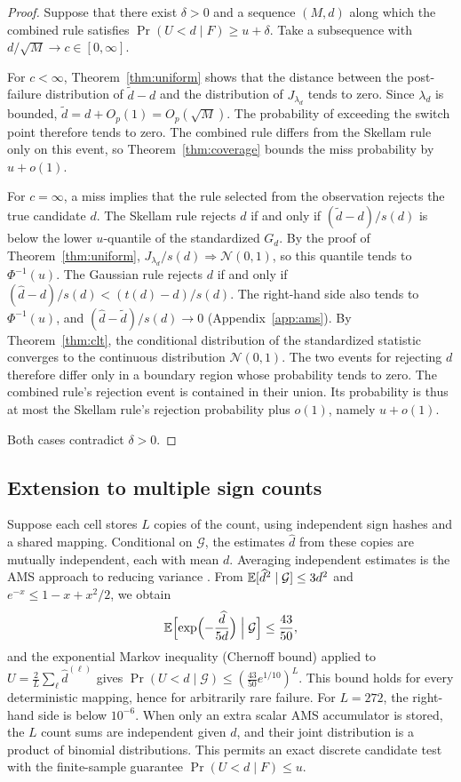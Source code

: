 \begin{proof}
Suppose that there exist $\delta>0$ and a sequence $(M,d)$ along which the combined rule satisfies $\Pr(U<d\mid F)\ge u+\delta$. Take a subsequence with $d/\sqrt M\to c\in[0,\infty]$.

For $c<\infty$, Theorem~\ref{thm:uniform} shows that the distance between the post-failure distribution of $\widetilde d-d$ and the distribution of $J_{\lambda_d}$ tends to zero. Since $\lambda_d$ is bounded, $\widetilde d=d+O_p(1)=O_p(\sqrt M)$. The probability of exceeding the switch point therefore tends to zero. The combined rule differs from the Skellam rule only on this event, so Theorem~\ref{thm:coverage} bounds the miss probability by $u+o(1)$.

For $c=\infty$, a miss implies that the rule selected from the observation rejects the true candidate $d$. The Skellam rule rejects $d$ if and only if $(\widetilde d-d)/s(d)$ is below the lower $u$-quantile of the standardized $G_d$. By the proof of Theorem~\ref{thm:uniform}, $J_{\lambda_d}/s(d)\Rightarrow\mathcal N(0,1)$, so this quantile tends to $\Phi^{-1}(u)$. The Gaussian rule rejects $d$ if and only if $(\widehat d-d)/s(d)<(t(d)-d)/s(d)$. The right-hand side also tends to $\Phi^{-1}(u)$, and $(\widehat d-\widetilde d)/s(d)\to0$ (Appendix~\ref{app:ams}). By Theorem~\ref{thm:clt}, the conditional distribution of the standardized statistic converges to the continuous distribution $\mathcal N(0,1)$. The two events for rejecting $d$ therefore differ only in a boundary region whose probability tends to zero. The combined rule's rejection event is contained in their union. Its probability is thus at most the Skellam rule's rejection probability plus $o(1)$, namely $u+o(1)$.

Both cases contradict $\delta>0$.
\end{proof}

\subsection{Extension to multiple sign counts}\label{app:multi}
Suppose each cell stores $L$ copies of the count, using independent sign hashes and a shared mapping. Conditional on $\mathcal G$, the estimates $\widehat d$ from these copies are mutually independent, each with mean $d$. Averaging independent estimates is the AMS approach to reducing variance \cite{alon1999spacecomplexity}. From $\mathbb E[\widehat d^2\mid\mathcal G]\le3d^2$ and $e^{-x}\le1-x+x^2/2$, we obtain
\begin{equation*}
\mathbb E\Bigl[\exp\Bigl(-\frac{\widehat d}{5d}\Bigr)\Bigm|\mathcal G\Bigr]\le\frac{43}{50},
\end{equation*}
and the exponential Markov inequality (Chernoff bound) applied to $U=\frac2L\sum_\ell\widehat d^{(\ell)}$ gives $\Pr(U<d\mid\mathcal G)\le(\frac{43}{50}e^{1/10})^L$. This bound holds for every deterministic mapping, hence for arbitrarily rare failure. For $L=272$, the right-hand side is below $10^{-6}$. When only an extra scalar AMS accumulator is stored, the $L$ count sums are independent given $d$, and their joint distribution is a product of binomial distributions. This permits an exact discrete candidate test with the finite-sample guarantee $\Pr(U<d\mid F)\le u$.

